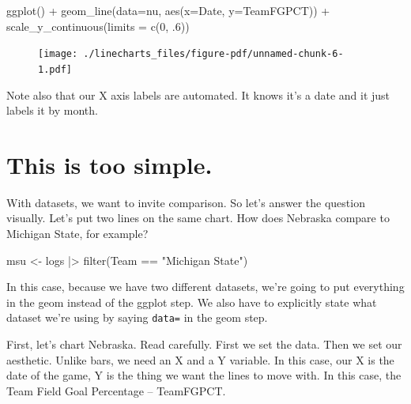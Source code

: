 \documentclass[
  letterpaper,
  DIV=11,
  numbers=noendperiod]{scrreprt}
\newenvironment{Shaded}{\begin{snugshade}}{\end{snugshade}}
\newcommand{\AttributeTok}[1]{\textcolor[rgb]{0.40,0.45,0.13}{#1}}
\newcommand{\DecValTok}[1]{\textcolor[rgb]{0.68,0.00,0.00}{#1}}
\newcommand{\FunctionTok}[1]{\textcolor[rgb]{0.28,0.35,0.67}{#1}}
\newcommand{\NormalTok}[1]{\textcolor[rgb]{0.00,0.23,0.31}{#1}}
\newcommand{\OtherTok}[1]{\textcolor[rgb]{0.00,0.23,0.31}{#1}}
\newcommand{\SpecialCharTok}[1]{\textcolor[rgb]{0.37,0.37,0.37}{#1}}
\newcommand{\StringTok}[1]{\textcolor[rgb]{0.13,0.47,0.30}{#1}}
\begin{document}
\begin{Shaded}
\begin{Highlighting}[]
\FunctionTok{ggplot}\NormalTok{() }\SpecialCharTok{+} 
  \FunctionTok{geom\_line}\NormalTok{(}\AttributeTok{data=}\NormalTok{nu, }\FunctionTok{aes}\NormalTok{(}\AttributeTok{x=}\NormalTok{Date, }\AttributeTok{y=}\NormalTok{TeamFGPCT)) }\SpecialCharTok{+} 
  \FunctionTok{scale\_y\_continuous}\NormalTok{(}\AttributeTok{limits =} \FunctionTok{c}\NormalTok{(}\DecValTok{0}\NormalTok{, .}\DecValTok{6}\NormalTok{))}
\end{Highlighting}
\end{Shaded}

\begin{figure}[H]

{\centering \texttt{[image: ./linecharts\_files/figure-pdf/unnamed-chunk-6-1.pdf]}

}

\end{figure}

Note also that our X axis labels are automated. It knows it's a date and
it just labels it by month.

\hypertarget{this-is-too-simple.}{%
\section{This is too simple.}\label{this-is-too-simple.}}

With datasets, we want to invite comparison. So let's answer the
question visually. Let's put two lines on the same chart. How does
Nebraska compare to Michigan State, for example?

\begin{Shaded}
\begin{Highlighting}[]
\NormalTok{msu }\OtherTok{\textless{}{-}}\NormalTok{ logs }\SpecialCharTok{|\textgreater{}} \FunctionTok{filter}\NormalTok{(Team }\SpecialCharTok{==} \StringTok{"Michigan State"}\NormalTok{)}
\end{Highlighting}
\end{Shaded}

In this case, because we have two different datasets, we're going to put
everything in the geom instead of the ggplot step. We also have to
explicitly state what dataset we're using by saying \texttt{data=} in
the geom step.

First, let's chart Nebraska. Read carefully. First we set the data. Then
we set our aesthetic. Unlike bars, we need an X and a Y variable. In
this case, our X is the date of the game, Y is the thing we want the
lines to move with. In this case, the Team Field Goal Percentage --
TeamFGPCT.
\end{document}
